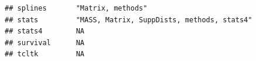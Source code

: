 \documentclass[]{article}
\begin{document}
\begin{verbatim}
## splines       "Matrix, methods"                                                                                                                                                                                                                                                                                                                                                                                                                                                                                                                                                                         
## stats         "MASS, Matrix, SuppDists, methods, stats4"                                                                                                                                                                                                                                                                                                                                                                                                                                                                                                                                                
## stats4        NA                                                                                                                                                                                                                                                                                                                                                                                                                                                                                                                                                                                        
## survival      NA                                                                                                                                                                                                                                                                                                                                                                                                                                                                                                                                                                                        
## tcltk         NA                                                                                                                                                                                                                                                                                                                                                                                                                                                                                                                                                                                        

\end{verbatim}
\end{document}

